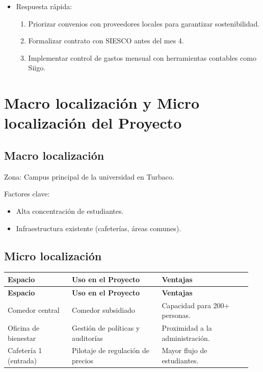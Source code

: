 \documentclass[letterpaper, 11pt]{report}
\begin{document}
\begin{enumerate}
\begin{itemize}
                  \item  Respuesta rápida: \begin{enumerate}
                              \item Priorizar convenios con proveedores locales para garantizar sostenibilidad.
                              \item Formalizar contrato con SIESCO antes del mes 4.
                              \item Implementar control de gastos mensual con herramientas contables como Siigo.
                        \end{enumerate}
            \end{itemize}
\end{enumerate}

\section{Macro localización y Micro localización del Proyecto}

\subsection{Macro localización}

Zona: Campus principal de la universidad en Turbaco.

Factores clave: \begin{itemize}
      \item Alta concentración de estudiantes.
      \item Infraestructura existente (cafeterías, áreas comunes).

\end{itemize}

\subsection{Micro localización}

\begin{longtable}{|p{0.25\linewidth}|p{0.35\linewidth}|p{0.35\linewidth}|}
      \hline
      \textbf{Espacio}     & \textbf{Uso en el Proyecto}       & \textbf{Ventajas}             \\
      \hline
      \endfirsthead

      \hline
      \textbf{Espacio}     & \textbf{Uso en el Proyecto}       & \textbf{Ventajas}             \\
      \hline
      \endhead

      Comedor central      & Comedor subsidiado                & Capacidad para 200+ personas. \\ \hline
      Oficina de bienestar & Gestión de políticas y auditorías & Proximidad a la
      administración.                                                                          \\ \hline Cafetería 1 (entrada) & Pilotaje de regulación de
      precios              & Mayor flujo de estudiantes.                                       \\ \hline

\end{longtable}
\end{document}
